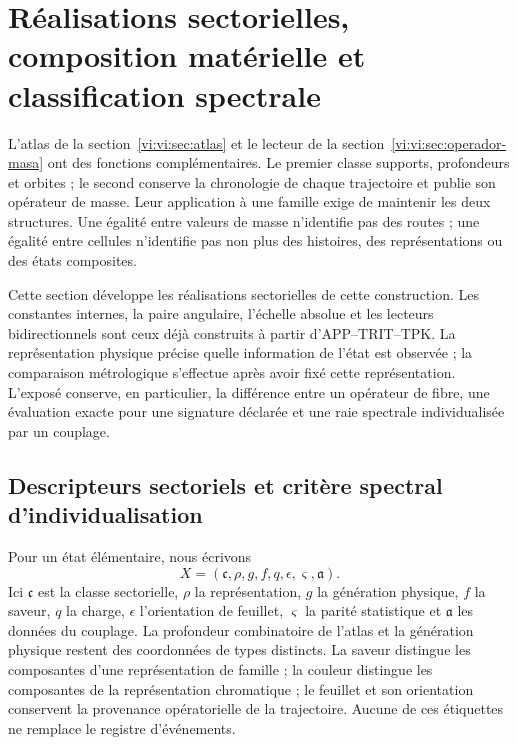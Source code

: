 \section{Réalisations sectorielles, composition matérielle et classification spectrale}
\label{vi:vi:sec:familias-compuestos}

L'atlas de la section~\ref{vi:vi:sec:atlas} et le lecteur de la
section~\ref{vi:vi:sec:operador-masa} ont des fonctions complémentaires. Le
premier classe supports, profondeurs et orbites ; le second conserve la
chronologie de chaque trajectoire et publie son opérateur de masse. Leur application
à une famille exige de maintenir les deux structures. Une égalité entre
valeurs de masse n'identifie pas des routes ; une égalité entre cellules n'identifie pas non plus
des histoires, des représentations ou des états composites.

Cette section développe les réalisations sectorielles de cette
construction. Les constantes internes, la paire angulaire, l’échelle absolue
et les lecteurs bidirectionnels sont ceux déjà construits à partir
d’APP--TRIT--TPK. La représentation physique précise quelle information de
l’état est observée ; la comparaison métrologique s’effectue après avoir fixé
cette représentation. L’exposé conserve, en particulier, la différence
entre un opérateur de fibre, une évaluation exacte pour une signature déclarée
et une raie spectrale individualisée par un couplage.

\subsection{Descripteurs sectoriels et critère spectral d'individualisation}
\label{vi:vi:subsec:descriptor-familia}

Pour un état élémentaire, nous écrivons
\[
 X=(\mathfrak c,\rho,g,f,q,\epsilon,\varsigma,\mathfrak a).
\]
Ici \(\mathfrak c\) est la classe sectorielle, \(\rho\) la représentation,
\(g\) la génération physique, \(f\) la saveur, \(q\) la charge,
\(\epsilon\) l'orientation de feuillet, \(\varsigma\) la parité statistique
et \(\mathfrak a\) les données du couplage. La profondeur combinatoire
de l'atlas et la génération physique restent des coordonnées de types
distincts. La saveur distingue les composantes d'une représentation de
famille ; la couleur distingue les composantes de la représentation chromatique ;
le feuillet et son orientation conservent la provenance opératorielle de la
trajectoire. Aucune de ces étiquettes ne remplace le registre d'événements.

